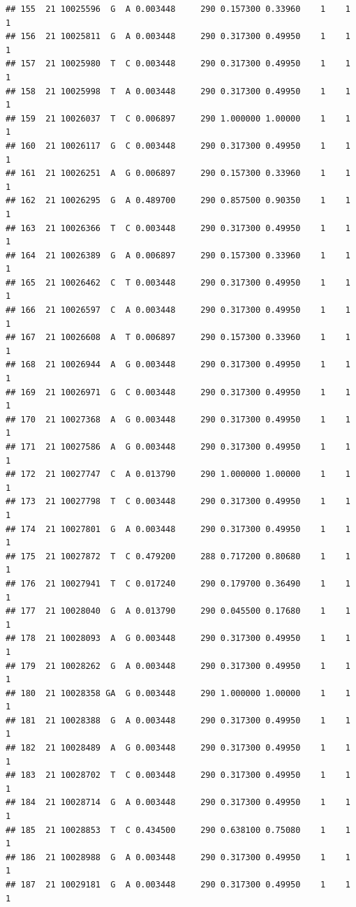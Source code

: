 \documentclass[
]{article}
\begin{document}
\begin{verbatim}
## 155  21 10025596  G  A 0.003448     290 0.157300 0.33960    1    1        1
## 156  21 10025811  G  A 0.003448     290 0.317300 0.49950    1    1        1
## 157  21 10025980  T  C 0.003448     290 0.317300 0.49950    1    1        1
## 158  21 10025998  T  A 0.003448     290 0.317300 0.49950    1    1        1
## 159  21 10026037  T  C 0.006897     290 1.000000 1.00000    1    1        1
## 160  21 10026117  G  C 0.003448     290 0.317300 0.49950    1    1        1
## 161  21 10026251  A  G 0.006897     290 0.157300 0.33960    1    1        1
## 162  21 10026295  G  A 0.489700     290 0.857500 0.90350    1    1        1
## 163  21 10026366  T  C 0.003448     290 0.317300 0.49950    1    1        1
## 164  21 10026389  G  A 0.006897     290 0.157300 0.33960    1    1        1
## 165  21 10026462  C  T 0.003448     290 0.317300 0.49950    1    1        1
## 166  21 10026597  C  A 0.003448     290 0.317300 0.49950    1    1        1
## 167  21 10026608  A  T 0.006897     290 0.157300 0.33960    1    1        1
## 168  21 10026944  A  G 0.003448     290 0.317300 0.49950    1    1        1
## 169  21 10026971  G  C 0.003448     290 0.317300 0.49950    1    1        1
## 170  21 10027368  A  G 0.003448     290 0.317300 0.49950    1    1        1
## 171  21 10027586  A  G 0.003448     290 0.317300 0.49950    1    1        1
## 172  21 10027747  C  A 0.013790     290 1.000000 1.00000    1    1        1
## 173  21 10027798  T  C 0.003448     290 0.317300 0.49950    1    1        1
## 174  21 10027801  G  A 0.003448     290 0.317300 0.49950    1    1        1
## 175  21 10027872  T  C 0.479200     288 0.717200 0.80680    1    1        1
## 176  21 10027941  T  C 0.017240     290 0.179700 0.36490    1    1        1
## 177  21 10028040  G  A 0.013790     290 0.045500 0.17680    1    1        1
## 178  21 10028093  A  G 0.003448     290 0.317300 0.49950    1    1        1
## 179  21 10028262  G  A 0.003448     290 0.317300 0.49950    1    1        1
## 180  21 10028358 GA  G 0.003448     290 1.000000 1.00000    1    1        1
## 181  21 10028388  G  A 0.003448     290 0.317300 0.49950    1    1        1
## 182  21 10028489  A  G 0.003448     290 0.317300 0.49950    1    1        1
## 183  21 10028702  T  C 0.003448     290 0.317300 0.49950    1    1        1
## 184  21 10028714  G  A 0.003448     290 0.317300 0.49950    1    1        1
## 185  21 10028853  T  C 0.434500     290 0.638100 0.75080    1    1        1
## 186  21 10028988  G  A 0.003448     290 0.317300 0.49950    1    1        1
## 187  21 10029181  G  A 0.003448     290 0.317300 0.49950    1    1        1

\end{verbatim}
\end{document}
